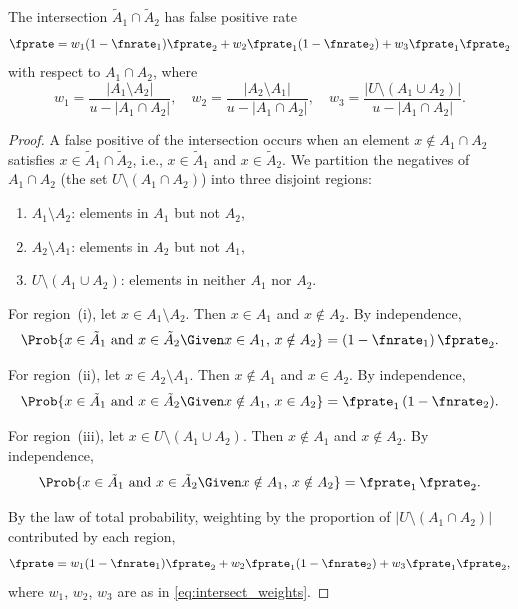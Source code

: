 \begin{theorem}
\label{thm:intersect_fprate}
The intersection $\tilde{A}_1 \cap \tilde{A}_2$ has false positive rate
\begin{equation}
\label{eq:intersect_fpr}
\fprate = w_1 (1 - \fnrate_1) \fprate_2
        + w_2 \fprate_1 (1 - \fnrate_2)
        + w_3 \fprate_1 \fprate_2
\end{equation}
with respect to $A_1 \cap A_2$, where
\begin{equation}
\label{eq:intersect_weights}
w_1 = \frac{|A_1 \setminus A_2|}{u - |A_1 \cap A_2|}, \quad
w_2 = \frac{|A_2 \setminus A_1|}{u - |A_1 \cap A_2|}, \quad
w_3 = \frac{|U \setminus (A_1 \cup A_2)|}{u - |A_1 \cap A_2|}.
\end{equation}
\end{theorem}
\begin{proof}
A false positive of the intersection occurs when an element
$x \notin A_1 \cap A_2$ satisfies $x \in \tilde{A}_1 \cap \tilde{A}_2$,
i.e., $x \in \tilde{A}_1$ and $x \in \tilde{A}_2$.
We partition the negatives of $A_1 \cap A_2$
(the set $U \setminus (A_1 \cap A_2)$) into three disjoint regions:
\begin{enumerate}[label=(\roman*)]
    \item $A_1 \setminus A_2$: elements in $A_1$ but not $A_2$,
    \item $A_2 \setminus A_1$: elements in $A_2$ but not $A_1$,
    \item $U \setminus (A_1 \cup A_2)$: elements in neither
        $A_1$ nor $A_2$.
\end{enumerate}

For region~(i), let $x \in A_1 \setminus A_2$.
Then $x \in A_1$ and $x \notin A_2$.
By independence,
\begin{equation}
\Prob{x \in \tilde{A}_1 \text{ and } x \in \tilde{A}_2
    \Given x \in A_1,\, x \notin A_2}
= (1 - \fnrate_1)\, \fprate_2.
\end{equation}

For region~(ii), let $x \in A_2 \setminus A_1$.
Then $x \notin A_1$ and $x \in A_2$.
By independence,
\begin{equation}
\Prob{x \in \tilde{A}_1 \text{ and } x \in \tilde{A}_2
    \Given x \notin A_1,\, x \in A_2}
= \fprate_1\, (1 - \fnrate_2).
\end{equation}

For region~(iii), let $x \in U \setminus (A_1 \cup A_2)$.
Then $x \notin A_1$ and $x \notin A_2$.
By independence,
\begin{equation}
\Prob{x \in \tilde{A}_1 \text{ and } x \in \tilde{A}_2
    \Given x \notin A_1,\, x \notin A_2}
= \fprate_1\, \fprate_2.
\end{equation}

By the law of total probability, weighting by the proportion of
$|U \setminus (A_1 \cap A_2)|$ contributed by each region,
\begin{equation}
\fprate
= w_1 (1 - \fnrate_1) \fprate_2
+ w_2 \fprate_1 (1 - \fnrate_2)
+ w_3 \fprate_1 \fprate_2,
\end{equation}
where $w_1$, $w_2$, $w_3$ are as in
\cref{eq:intersect_weights}.
\end{proof}

